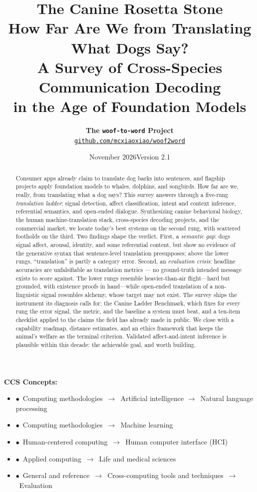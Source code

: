 \documentclass[11pt]{article}
\title{\vspace{-1.2cm}\textbf{\Huge The Canine Rosetta Stone}\\[0.35cm]
\Large How Far Are We from Translating What Dogs Say?\\[0.25cm]
\large A Survey of Cross-Species Communication Decoding\\ in the Age of Foundation Models}
\author{\textbf{The \texttt{woof-to-word} Project}\\[0.15cm]
\small \href{https://github.com/mcxiaoxiao/woof2word}{\texttt{github.com/mcxiaoxiao/woof2word}}}
\date{\small November 2026\quad\textbullet\quad Version 2.1}
\begin{document}
\maketitle
\thispagestyle{fancy}

\begin{abstract}
\noindent
Consumer apps already claim to translate dog barks into sentences, and
flagship projects apply foundation models to whales, dolphins, and songbirds.
How far are we, really, from translating what a dog says? This survey answers
through a five-rung \emph{translation ladder}: signal detection, affect
classification, intent and context inference, referential semantics, and
open-ended dialogue. Synthesizing canine behavioral biology, the human
machine-translation stack, cross-species decoding projects, and the
commercial market, we locate today's best systems on the second rung, with
scattered footholds on the third. Two findings shape the verdict. First, a
\emph{semantic gap}: dogs signal affect, arousal, identity, and some
referential content, but show no evidence of the generative syntax that
sentence-level translation presupposes; above the lower rungs, ``translation''
is partly a category error. Second, an \emph{evaluation crisis}: headline
accuracies are unfalsifiable as translation metrics --- no ground-truth
intended message exists to score against. The lower rungs resemble
heavier-than-air flight---hard but grounded, with existence proofs in
hand---while open-ended translation of a non-linguistic signal resembles
alchemy, whose target may not exist. The survey ships the instrument its
diagnosis calls for: the Canine Ladder Benchmark, which fixes for every rung
the error signal, the metric, and the baseline a system must beat, and a
ten-item checklist applied to the claims the field has already made
in public. We close with a capability roadmap,
distance estimates, and an ethics framework that keeps the animal's welfare
as the terminal criterion. Validated affect-and-intent inference is plausible
within this decade: the achievable goal, and worth building.
\end{abstract}

\vspace{0.3cm}

\noindent\textbf{CCS Concepts:}
\begin{itemize}[nosep,leftmargin=1.2em]
\item$\bullet$~Computing methodologies~$\rightarrow$~Artificial intelligence
  $\rightarrow$~Natural language processing
\item$\bullet$~Computing methodologies~$\rightarrow$~Machine learning
\item$\bullet$~Human-centered computing~$\rightarrow$~Human computer
  interface (HCI)
\item$\bullet$~Applied computing~$\rightarrow$~Life and medical sciences
\item$\bullet$~General and reference~$\rightarrow$~Cross-computing tools and
  techniques~$\rightarrow$~Evaluation
\end{itemize}
\end{document}
